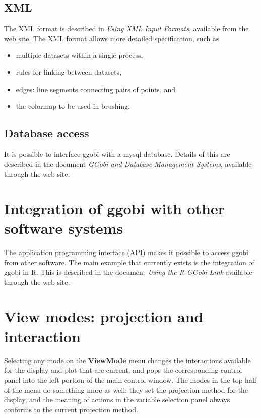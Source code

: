 \documentclass[11pt]{article}
\begin{document}
\subsection {XML}
\label{slbl:XML}

The XML format is described in {\em Using XML Input Formats},
available from the web site.  The XML format allows more detailed
specification, such as

\begin{itemize}
\item multiple datasets within a single process,
\item rules for linking between datasets,
\item edges: line segments connecting pairs of points, and
\item the colormap to be used in brushing.
\end{itemize}

\subsection {Database access}
\label{slbl:MySQL}

It is possible to interface ggobi with a mysql database. Details of
this are described in the document {\em GGobi and Database Management
Systems}, available through the web site.

\section{Integration of ggobi with other software systems}
\label{slbl:Integration}

The application programming interface (API) makes it possible to
access ggobi from other software. The main example that currently
exists is the integration of ggobi in R. This is described in the
document {\em Using the R-GGobi Link} available through the web site.

\section{View modes: projection and interaction}
\label{slbl:ViewModes}

Selecting any mode on the {\bf ViewMode} menu changes the interactions
available for the display and plot that are current, and pops the
corresponding control panel into the left portion of the main control
window.  The modes in the top half of the menu do something more as
well:  they set the projection method for the display, and the meaning
of actions in the variable selection panel always conforms to the current
projection method.
\end{document}
